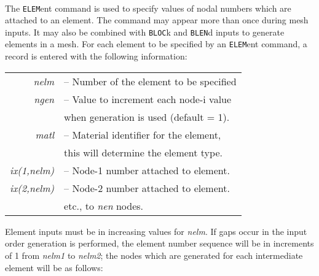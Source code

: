  \\{\smallskip}
 \\{\smallskip}
 \\{\smallskip}
 \\{\smallskip}
 \\{\smallskip}
 \\{\smallskip}
\headb

The {\tt ELEM}ent command is used to specify values of
nodal numbers which are attached to an element.  The command may appear
more than once during mesh inputs.  It may also be combined with {\tt BLOC}k
and {\tt BLEN}d inputs to generate elements in a mesh.  For each
element to be specified by an {\tt ELEM}ent command,
a record is entered with the following information:

\begin{center}
\begin{tabular}{r l}
\it nelm        &-- Number of the element to be specified \\
\it ngen        &-- Value to increment each node-i value \\
                &\quad when generation is used (default = 1). \\
\it matl        &-- Material identifier for the element, \\
                &\quad this will determine the element type. \\
\it ix(1,nelm)  &-- Node-1 number attached to element. \\
\it ix(2,nelm)  &-- Node-2 number attached to element. \\
                &\quad  etc., to {\it nen} nodes. \\
\end{tabular}
\end{center}
Element inputs must be in increasing values for {\it nelm}.
If gaps occur in the input order 
generation is performed, the element number
sequence will be in increments of 1 from {\it nelm1} to {\it nelm2};
the nodes which are generated for each intermediate element
will be as follows:

